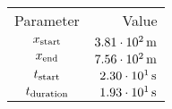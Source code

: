 \begin{tabular}{cr}
    \toprule
    Parameter & Value \\ \otoprule
    $x_{\textup{start}}$    & $\unit[3.81 \cdot 10^{2}]{m}$ \\
    $x_{\textup{end}}$      & $\unit[7.56 \cdot 10^{2}]{m}$ \\
    $t_{\textup{start}}$    & $\unit[2.30 \cdot 10^{1}]{s}$ \\
    $t_{\textup{duration}}$ & $\unit[1.93 \cdot 10^{1}]{s}$ \\
    \bottomrule
\end{tabular}

